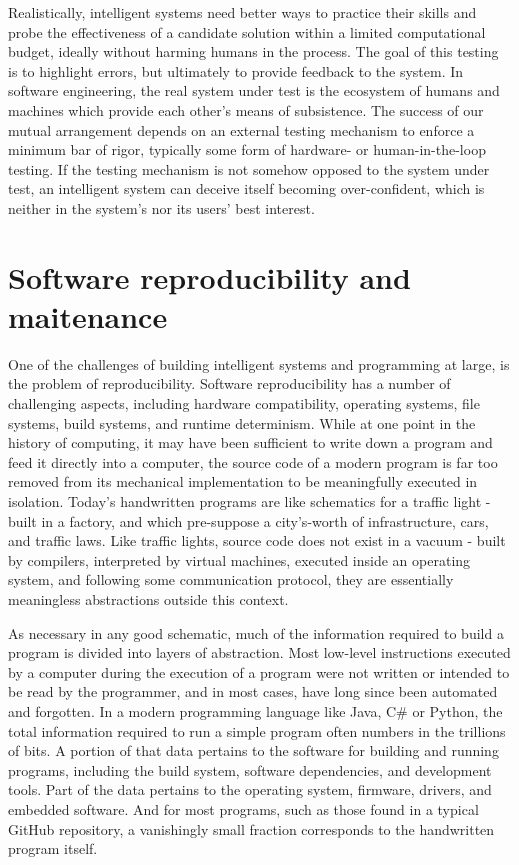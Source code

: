\documentclass[12pt,initial,twoside,maitrise]{dms}
\numberwithin{equation}{section}
\numberwithin{table}{chapter}
\numberwithin{figure}{chapter}
\begin{document}
Realistically, intelligent systems need better ways to practice their skills and probe the effectiveness of a candidate solution within a limited computational budget, ideally without harming humans in the process. The goal of this testing is to highlight errors, but ultimately to provide feedback to the system. In software engineering, the real system under test is the ecosystem of humans and machines which provide each other's means of subsistence. The success of our mutual arrangement depends on an external testing mechanism to enforce a minimum bar of rigor, typically some form of hardware- or human-in-the-loop testing. If the testing mechanism is not somehow opposed to the system under test, an intelligent system can deceive itself becoming over-confident, which is neither in the system's nor its users' best interest.

\section{Software reproducibility and maitenance}

One of the challenges of building intelligent systems and programming at large, is the problem of reproducibility. Software reproducibility has a number of challenging aspects, including hardware compatibility, operating systems, file systems, build systems, and runtime determinism. While at one point in the history of computing, it may have been sufficient to write down a program and feed it directly into a computer, the source code of a modern program is far too removed from its mechanical implementation to be meaningfully executed in isolation. Today's handwritten programs are like schematics for a traffic light - built in a factory, and which pre-suppose a city's-worth of infrastructure, cars, and traffic laws. Like traffic lights, source code does not exist in a vacuum - built by compilers, interpreted by virtual machines, executed inside an operating system, and following some communication protocol, they are essentially meaningless abstractions outside this context.

As necessary in any good schematic, much of the information required to build a program is divided into layers of abstraction. Most low-level instructions executed by a computer during the execution of a program were not written or intended to be read by the programmer, and in most cases, have long since been automated and forgotten. In a modern programming language like Java, C\# or Python, the total information required to run a simple program often numbers in the trillions of bits. A portion of that data pertains to the software for building and running programs, including the build system, software dependencies, and development tools. Part of the data pertains to the operating system, firmware, drivers, and embedded software. And for most programs, such as those found in a typical GitHub repository, a vanishingly small fraction corresponds to the handwritten program itself.
\end{document}
